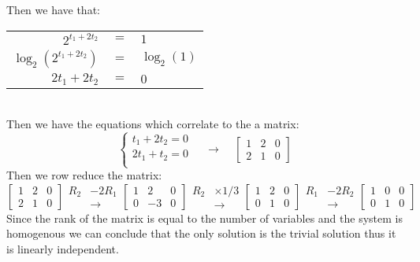 \documentclass{article}
\begin{document}
Then we have that: 
\begin{table}[htp]
\centering
\begin{tabular}{rcl}
  $2^{t_{1}+2t_{2}}$ & $=$  & $1$  \\
  $\log_{2}(2^{t_{1}+2t_{2}})$ & $=$  & $\log_{2}(1)$  \\
  $2t_{1}+2t_{2}$ & $=$  & $0$  \\
\end{tabular}
\end{table}\\
Then we have the equations which correlate to the a matrix: $$\begin{cases}
t_{1}+2t_{2}=0\\
2t_{1}+t_{2}=0\\
\end{cases}\;\;\;\;\rightarrow\;\;\;\;\left[\begin{array}{cc|c}
1&2&0\\2&1&0
\end{array}\right]$$
Then we row reduce the matrix: $$\left[\begin{array}{cc|c}
1&2&0\\
2&1&0
\end{array}\right]\begin{aligned}
    R_{2}&-2R_{1}\\
    &\rightarrow
\end{aligned}\left[\begin{array}{cc|c}
1&2&0\\
0&-3&0
\end{array}\right]\begin{aligned}
    R_{2}&\times 1/3\\
    &\rightarrow
\end{aligned}\begin{bmatrix} 
1&2&0\\
0&1&0
\end{bmatrix}\begin{aligned}
    R_{1}&-2R_{2}\\
    &\rightarrow
\end{aligned}\left[\begin{array}{cc|c}
1&0&0\\0&1&0
\end{array}\right]$$
Since the rank of the matrix is equal to the number of variables and the system is homogenous we can conclude that the only solution is the trivial solution thus it is linearly independent.
\newpage
\end{document}
